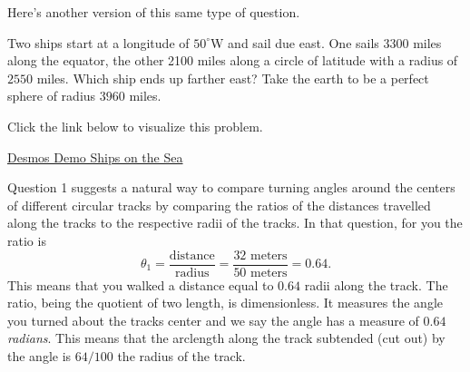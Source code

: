 \documentclass{ximera}
\newcommand{\pskip}{\vskip 0.1 in}
\begin{document}
Here's another version of this same type of question.





\begin{question}  \label{Q2543:Angles}
Two ships start at a longitude of $50^\circ$W and sail due east. One sails 3300 miles along the equator, the other 2100 miles along a circle of latitude with a radius of $2550$ miles. Which ship ends up farther east? Take the earth to be a perfect sphere of radius $3960$ miles.

Click the link below to visualize this problem.

\href{https://www.desmos.com/3d/2f0ea20aec}{Desmos Demo Ships on the Sea}

\end{question}

Question 1 suggests a natural way to compare turning angles around the centers of different circular tracks by comparing the ratios of the distances travelled along the tracks to the respective radii of the tracks. In that question, for you the ratio is
\[
    \theta_1 = \frac{\text{distance}}{\text{radius}} = \frac{32 \text{ meters}}{50 \text{ meters}} = 0.64.
\]
This means that you walked a distance equal to $0.64$ radii along the track. The ratio, being the quotient of two length, is dimensionless. It measures the angle you turned about the tracks center and we say the angle has a measure of $0.64$ \emph{radians}. This means that the arclength along the track subtended (cut out) by the angle is $64/100$ the radius of the track.  
\end{document}

